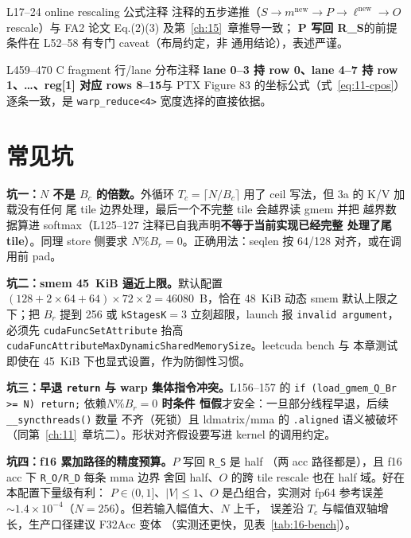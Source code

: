 \begin{kaogu}[F3 核校通过]{L17--24 online rescaling 公式注释}
  注释的五步递推（$S\to m^{\text{new}}\to P\to \ell^{\text{new}}\to O$
  rescale）与 FA2 论文 Eq.(2)(3) 及第~\ref{ch:15}~章推导一致；
  \textbf{P 写回 R\_S}的前提条件在 L52--58 有专门 caveat（布局约定，非
  通用结论），表述严谨。
\end{kaogu}

\begin{kaogu}[F2 核校通过]{L459--470 C fragment 行/lane 分布注释}
  \textbf{lane 0--3 持 row 0、lane 4--7 持 row 1、\ldots、reg[1] 对应
  rows 8--15}与 PTX Figure 83 的坐标公式（式~\ref{eq:11-cpos}）
  逐条一致，是 \texttt{warp\_\allowbreak{}reduce\allowbreak{}<4>} 宽度选择的直接依据。
\end{kaogu}

\section{常见坑}

\textbf{坑一：$N$ 不是 $B_c$ 的倍数。}外循环
$T_c=\lceil N/B_c\rceil$ 用了 ceil 写法，但 3a 的 K/V 加载没有任何
尾 tile 边界处理，最后一个不完整 tile 会越界读 gmem 并把
越界数据算进 softmax（L125--127 注释已自我声明\textbf{不等于当前实现已经完整
处理了尾 tile}）。同理 store 侧要求 $N\%B_r=0$。正确用法：seqlen
按 64/128 对齐，或在调用前 pad。

\textbf{坑二：smem 45~KiB 逼近上限。}默认配置
$(128{+}2{\times}64{+}64)\times72\times2 = 46080$~B，恰在 48~KiB
动态 smem 默认上限之下；把 $B_r$ 提到 256 或 \texttt{kStagesK}$=$3
立刻超限，launch 报 \texttt{invalid argument}，必须先
\texttt{cuda\allowbreak{}Func\allowbreak{}Set\allowbreak{}Attribute} 抬高
\texttt{cuda\allowbreak{}Func\allowbreak{}Attribute\allowbreak{}Max\allowbreak{}Dynamic\allowbreak{}Shared\allowbreak{}Memory\allowbreak{}Size}。leetcuda bench 与
本章测试即使在 45~KiB 下也显式设置，作为防御性习惯。

\textbf{坑三：早退 \texttt{return} 与 warp 集体指令冲突。}\allowbreak{}L156--157 的
\texttt{if \allowbreak{}(load\_\allowbreak{}gmem\_\allowbreak{}Q\_\allowbreak{}Br >=\allowbreak{} N) return;} 依赖\textbf{$N\%B_r=0$ 时条件
恒假}才安全：一旦部分线程早退，后续 \texttt{\_\allowbreak{}\_\allowbreak{}syncthreads\allowbreak{}()} 数量
不齐（死锁）且 ldmatrix/mma 的 \texttt{.aligned} 语义被破坏
（同第~\ref{ch:11}~章坑二）。形状对齐假设要写进 kernel 的调用约定。

\textbf{坑四：f16 累加路径的精度预算。}$P$ 写回 \texttt{R\_S} 是 half
（两 acc 路径都是），且 f16 acc 下 \texttt{R\_O/R\_D} 每条 mma 边界
舍回 half、$O$ 的跨 tile rescale 也在 half 域。好在本配置下量级有利：
$P\in(0,1]$、$|V|\le 1$、$O$ 是凸组合，实测对 fp64 参考误差
$\sim 1.4\times10^{-4}$（$N{=}256$）。但若输入幅值大、$N$ 上千，
误差沿 $T_c$ 与幅值双轴增长，生产口径建议 F32Acc 变体
（实测还更快，见表~\ref{tab:16-bench}）。

